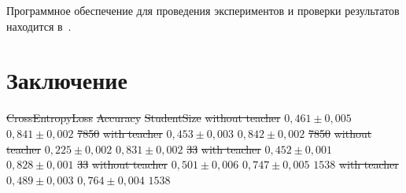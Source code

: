 \documentclass[12pt]{a&t}
\providecommand{\DIFdel}[1]{{\protect\color{red}\sout{#1}}}                      %
\providecommand{\DIFdelFL}[1]{\DIFdel{#1}} %
\providecommand{\DIFdelbeginFL}{} %
\newcommand{\DIFscaledelfig}{0.5}
\newlength{\DIFdelgraphicswidth} %
\newlength{\DIFdelgraphicsheight} %
\newcommand{\DIFdelincludegraphics}[2][]{%
\sbox{\DIFdelgraphicsbox}{\DIFOincludegraphics[#1]{#2}}%
\settoboxwidth{\DIFdelgraphicswidth}{\DIFdelgraphicsbox} %
\settoboxtotalheight{\DIFdelgraphicsheight}{\DIFdelgraphicsbox} %
\scalebox{\DIFscaledelfig}{%
\parbox[b]{\DIFdelgraphicswidth}{\usebox{\DIFdelgraphicsbox}\\[-\baselineskip] \rule{\DIFdelgraphicswidth}{0em}}\llap{\resizebox{\DIFdelgraphicswidth}{\DIFdelgraphicsheight}{%
\setlength{\unitlength}{\DIFdelgraphicswidth}%
\begin{picture}(1,1)%
\thicklines\linethickness{2pt} %
{\color[rgb]{1,0,0}\put(0,0){\framebox(1,1){}}}%
{\color[rgb]{1,0,0}\put(0,0){\line( 1,1){1}}}%
{\color[rgb]{1,0,0}\put(0,1){\line(1,-1){1}}}%
\end{picture}%
}\hspace*{3pt}}} %
} %
\DeclareRobustCommand{\DIFdelbeginFL}{\DIFOdelbeginFL \let\includegraphics\DIFdelincludegraphics} %
\begin{document}
Программное обеспечение для проведения экспериментов и проверки результатов находится в~\cite{Code2020}.

\section{Заключение}
\begin{table}[]
\caption{Сводная таблица результатов вычислительного эксперимента.}
\label{tb:ce:1}
\begin{center}
\DIFdelbeginFL %
\DIFdelFL{CrossEntropyLoss      }%
\DIFdelFL{Accuracy    }%
\DIFdelFL{StudentSize   }%
\DIFdelFL{without teacher    }%
\DIFdelFL{$0{,}461 \pm 0{,}005$ }%
\DIFdelFL{$0{,}841\pm 0{,}002$ }%
\DIFdelFL{7850 }%
\DIFdelFL{with teacher       }%
\DIFdelFL{$0{,}453 \pm 0{,}003$ }%
\DIFdelFL{$0{,}842 \pm 0{,}002$ }%
\DIFdelFL{7850}%
\DIFdelFL{without teacher    }%
\DIFdelFL{$0{,}225 \pm 0{,}002$ }%
\DIFdelFL{$0{,}831\pm 0{,}002$ }%
\DIFdelFL{33 }%
\DIFdelFL{with teacher       }%
\DIFdelFL{$0{,}452 \pm 0{,}001$   }%
\DIFdelFL{$0{,}828\pm 0{,}001$ }%
\DIFdelFL{33 }%
\DIFdelFL{without teacher    }%
\DIFdelFL{$0{,}501 \pm 0{,}006$ }%
\DIFdelFL{$0{,}747\pm 0{,}005$ }%
\DIFdelFL{$1538$  }%
\DIFdelFL{with teacher       }%
\DIFdelFL{$0{,}489 \pm 0{,}003$   }%
\DIFdelFL{$0{,}764\pm 0{,}004$ }%
\DIFdelFL{$1538$ }%

\end{center}
\end{table}
\end{document}

